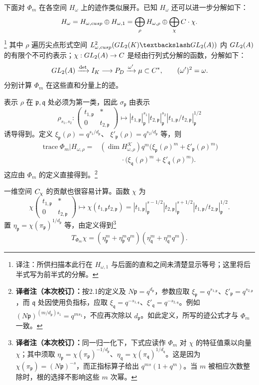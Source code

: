 下面对 $\Phi_m$ 在各空间 $H_\omega$ 上的迹作类似展开。已知 $H_\omega$ 还可以进一步分解如下：
\[
H_\omega=H_{\omega,cusp}\oplus H_{\omega,1}
=\bigoplus_\rho H_{\omega,\rho}\oplus\bigoplus_\chi C\cdot\chi.
\]
\footnote{译注：所供扫描本此行在 $H_{\omega,1}$ 与后面的直和之间未清楚显示等号；这里将后半式写为前半式的分解。}
其中 $\rho$ 遍历尖点形式空间
$L^2_{\omega,\mathrm{cusp}}(\GL_2(K)\backslash\GL_2(A))$
内 $GL_2(A)$ 的有限个不可约表示；$\chi:GL_2(A)\to C$ 是经由行列式分解的函数，分解如下：
\[
GL_2(A)\xrightarrow{\det}I_K\longrightarrow P_D
\xrightarrow{\omega'}\mu\subset C^*,\qquad(\omega')^2=\omega.
\]
分别计算 $\Phi_m$ 在这些直和分量上的迹。

表示 $\rho$ 在 $\mathfrak p,\mathfrak q$ 处必须为第一类，因此 $\sigma_{\mathfrak p}$ 由表示
\[
\rho_{s_1,s_2}:\begin{pmatrix}t_{1,\mathfrak p}&*\\0&t_{2,\mathfrak p}\end{pmatrix}
\longmapsto|t_{1,\mathfrak p}|_{\mathfrak p}^{s_1}|t_{2,\mathfrak p}|_{\mathfrak p}^{s_2}
|t_{1,\mathfrak p}/t_{2,\mathfrak p}|_{\mathfrak p}^{1/2}
\]
诱导得到。定义 $\xi_{\mathfrak p}(\rho)=q^{s_1/d_{\mathfrak p}}$、
$\xi'_{\mathfrak p}(\rho)=q^{s_2/d_{\mathfrak p}}$ 等，则
\begin{align*}
\operatorname{trace}\Phi_m|H_{\omega,\rho}
={}&(\dim H_{\omega,\rho}^{\mathcal K})q^m
\bigl(\xi_{\mathfrak p}(\rho)^m+\xi'_{\mathfrak p}(\rho)^m\bigr)\\
&\hspace{3em}\cdot\bigl(\xi_{\mathfrak q}(\rho)^m+\xi'_{\mathfrak q}(\rho)^m\bigr).
\end{align*}
这应由 $\Phi_m$ 的定义直接得到。\footnote{\textbf{译者注（本次校订）：}按2.1的定义及 $N\mathfrak p=q^{d_{\mathfrak p}}$，参数应取 $\xi_{\mathfrak p}=q^{s_{1,\mathfrak p}}$、$\xi'_{\mathfrak p}=q^{s_{2,\mathfrak p}}$，而 $\mathfrak q$ 处因使用负指标，应取 $\xi_{\mathfrak q}=q^{-s_{1,\mathfrak q}}$、$\xi'_{\mathfrak q}=q^{-s_{2,\mathfrak q}}$。例如 $(N\mathfrak p)^{(m/d_{\mathfrak p})s_1}=q^{ms_1}$，不应再次除以 $d_{\mathfrak p}$。如此定义，所写的迹公式才与 $\Phi_m$ 一致。}

一维空间 $C_\chi$ 的贡献也很容易计算。函数 $\chi$ 为
\[
\chi\begin{pmatrix}t_{1,\mathfrak p}&*\\0&t_{2,\mathfrak p}\end{pmatrix}
\longmapsto\chi(t_{1,\mathfrak p}t_{2,\mathfrak p})
=|t_{1,\mathfrak p}|_{\mathfrak p}^{s-1/2}
|t_{2,\mathfrak p}|_{\mathfrak p}^{s+1/2}
|t_{1,\mathfrak p}/t_{2,\mathfrak p}|_{\mathfrak p}^{1/2}.
\]
置 $\eta_{\mathfrak p}=\chi(\pi_{\mathfrak p})^{1/d_{\mathfrak p}}$ 等，由定义得到\footnote{\textbf{译者注（本次校订）：}同一归一化下，下式应读作 $\Phi_m$ 对 $\chi$ 的特征值乘以向量 $\chi$；其中须取 $\eta_{\mathfrak p}=\chi(\pi_{\mathfrak p})^{-1/d_{\mathfrak p}}$、$\eta_{\mathfrak q}=\chi(\pi_{\mathfrak q})^{1/d_{\mathfrak q}}$。这是因为 $\chi(\pi_{\mathfrak p})=(N\mathfrak p)^{-s}$，而正指标算子给出 $q^{ms}(1+q^m)$。当 $m$ 被相应次数整除时，根的选择不影响这些 $m$ 次幂。}
\[
T_{\Phi_m}\chi=
(\eta_{\mathfrak p}^m+\eta_{\mathfrak p}^mq^m)
(\eta_{\mathfrak q}^m+\eta_{\mathfrak q}^mq^m).
\]

